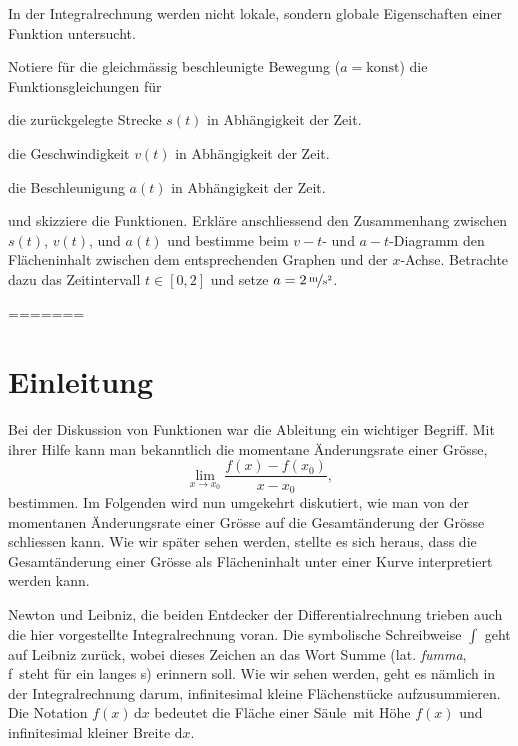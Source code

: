 \documentclass[%
<<<<<<< Updated upstream
11pt,%
twoside,%
titlepage,%
german,%
headsepline%
]{scrartcl}
\begin{document}
\begin{bem}
In der Integralrechnung werden nicht lokale, sondern globale Eigenschaften einer Funktion untersucht.
\end{bem}

\clearpage

\begin{ueb}[Standardbeispiel]
Notiere für die gleichmässig beschleunigte Bewegung ($a=\text{konst}$) die Funk\-tions\-glei\-chungen für
\begin{enumeratea}
\item die zurückgelegte Strecke $s(t)$ in Abhängigkeit der Zeit.
\item die Geschwindigkeit $v(t)$ in Abhängigkeit der Zeit.
\item die Beschleunigung $a(t)$ in Abhängigkeit der Zeit.
\end{enumeratea}
und skizziere die Funktionen. Erkläre anschliessend den Zusammenhang zwischen $s(t)$, $v(t)$, und $a(t)$ und bestimme beim $v-t$- und $a-t$-Diagramm den Flächeninhalt zwischen dem entsprechenden Graphen und der $x$-Achse. Betrachte dazu das Zeitintervall $t\in [0,2]$ und setze $a=\unitfrac[2]{m}{s^2}$.
\end{ueb}
=======
\section{Einleitung}

Bei der Diskussion von Funktionen war die Ableitung ein wichtiger Begriff. Mit ihrer Hilfe kann man bekanntlich die momentane Änderungsrate einer Grösse,
$$\lim_{x\rightarrow x_0}\frac{f(x)-f(x_0)}{x-x_0},$$
bestimmen. Im Folgenden wird nun umgekehrt diskutiert, wie man von der momentanen Änderungsrate einer Grösse auf die Gesamtänderung der Grösse schliessen kann. Wie wir später sehen werden, stellte es sich heraus, dass die Gesamtänderung einer Grösse als Flächeninhalt unter einer Kurve interpretiert werden kann.

Newton und Leibniz, die beiden Entdecker der Differentialrechnung trieben auch die hier vorgestellte Integralrechnung voran. Die symbolische Schreibweise $\int$ geht auf Leibniz zurück, wobei dieses Zeichen an das Wort Summe (lat. \emph{fumma}, \glqq f\grqq\ steht für ein langes s) erinnern soll. Wie wir sehen werden, geht es nämlich in der Integralrechnung darum, infinitesimal kleine Flächenstücke aufzusummieren. Die Notation $f(x)\,\mathrm{d}x$ bedeutet die Fläche einer \glqq Säule\grqq\ mit Höhe $f(x)$ und infinitesimal kleiner Breite $\mathrm{d}x$.
\end{document}
